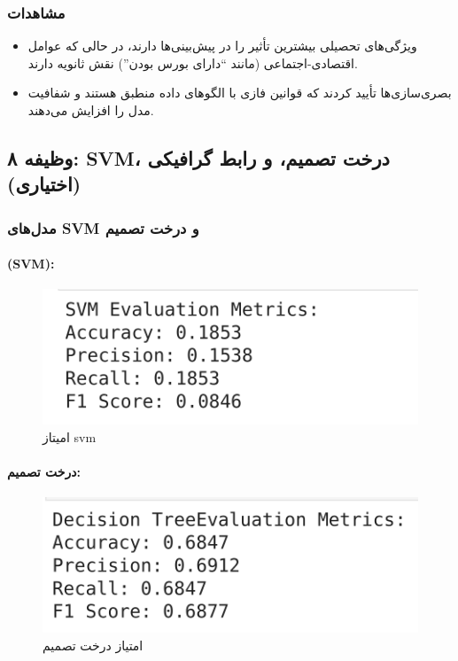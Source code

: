 \subsubsection{مشاهدات}

\begin{itemize}
	\item ویژگی‌های تحصیلی بیشترین تأثیر را در پیش‌بینی‌ها دارند، در حالی که عوامل اقتصادی-اجتماعی (مانند ``دارای بورس بودن'') نقش ثانویه دارند.
	
	\item بصری‌سازی‌ها تأیید کردند که قوانین فازی با الگوهای داده منطبق هستند و شفافیت مدل را افزایش می‌دهند.
\end{itemize}


\subsection{وظیفه ۸: SVM، درخت تصمیم، و رابط گرافیکی (اختیاری)}

\subsubsection{مدل‌های SVM و درخت تصمیم}

\paragraph{(SVM):}

\begin{figure}[H]
	\centering
	\includegraphics[width=0.7\linewidth]{img/dtree}
	\caption[]{امیتاز svm}
	\label{fig:dtree}
\end{figure}

\paragraph{درخت تصمیم:}
\begin{figure}[H]
	\centering
	\includegraphics[width=0.7\linewidth]{img/svm}
	\caption{امتیاز درخت تصمیم}
	\label{fig:svm}
\end{figure}



